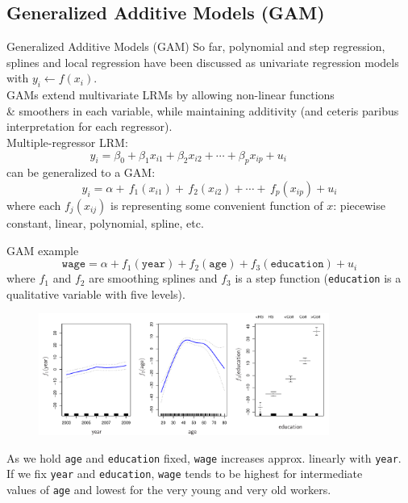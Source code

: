 \documentclass{beamer}
\begin{document}
\subsection{Generalized Additive Models (GAM)}
\begin{frame}{Generalized Additive Models (GAM)}
So far, polynomial and step regression, splines and local regression have been discussed as univariate regression models with $y_i \leftarrow f(x_i)$.\\
\medskip GAMs extend multivariate LRMs by allowing non-linear functions\\ \& smoothers in each variable, while maintaining additivity (and ceteris paribus interpretation for each regressor).\\ \medskip
Multiple-regressor LRM:
$$ y_i = \beta_0 + \beta_1 x_{i1} + \beta_2 x_{i2} + \cdots + \beta_p x_{ip} + u_i~~~~~~~~~~~~~~~~~$$
can be generalized to a GAM:
$$ y_i = \alpha + \, f_1(x_{i1}) + \, f_2(x_{i2}) + \cdots + \, f_p(x_{ip}) + u_i$$ 
where each $f_j(x_{ij})$ is representing some convenient function of $x$: piecewise constant, linear, polynomial, spline, etc.
\end{frame}
\begin{frame}{GAM example}
$$\texttt{wage} = \alpha + f_1(\texttt{year}) + f_2(\texttt{age}) + f_3(\texttt{education}) + u_i$$
\bigskip
where $f_1$ and $f_2$ are smoothing splines and $f_3$ is a step function (\texttt{education} is a qualitative variable with five levels).
\vspace{-0.2cm}
\begin{figure}
  \centering
  \includegraphics[trim=0cm 0cm 0cm 0cm, clip=true, width=0.85\textwidth]{IMG/ISLR712.pdf}
\end{figure}
\centering
\vspace{-0.3cm}
\tiny
As we hold \texttt{age} and \texttt{education} fixed, \texttt{wage} increases approx. linearly with \texttt{year}.\\
If we fix \texttt{year} and \texttt{education}, \texttt{wage} tends to be highest for intermediate \\values of  \texttt{age} and lowest for the very young and very old workers.
\end{frame}
\end{document}
